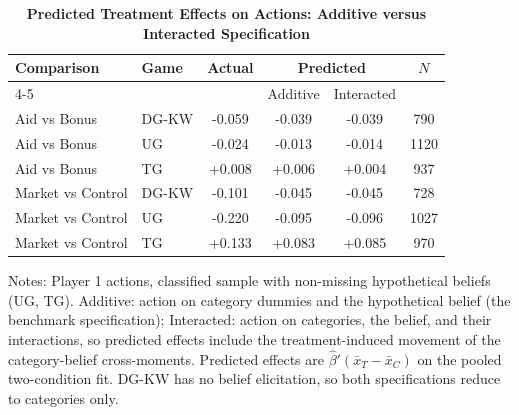 \begin{table}[!htbp]
\centering
\footnotesize
\renewcommand{\arraystretch}{1.15}
\caption{\textbf{Predicted Treatment Effects on Actions: Additive versus Interacted Specification}}
\label{tab:interaction_accounting}
\begin{tabular}{ll ccc c}
\toprule
Comparison & Game & Actual & \multicolumn{2}{c}{Predicted} & $N$ \\
\cmidrule(lr){4-5}
& & & Additive & Interacted & \\
\midrule
Aid vs Bonus & DG-KW & -0.059 & -0.039 & -0.039 & 790 \\
Aid vs Bonus & UG & -0.024 & -0.013 & -0.014 & 1120 \\
Aid vs Bonus & TG & +0.008 & +0.006 & +0.004 & 937 \\
Market vs Control & DG-KW & -0.101 & -0.045 & -0.045 & 728 \\
Market vs Control & UG & -0.220 & -0.095 & -0.096 & 1027 \\
Market vs Control & TG & +0.133 & +0.083 & +0.085 & 970 \\
\bottomrule
\end{tabular}
\begin{flushleft}
\footnotesize Notes: Player 1 actions, classified sample with non-missing hypothetical beliefs (UG, TG). Additive: action on category dummies and the hypothetical belief (the benchmark specification); Interacted: action on categories, the belief, and their interactions, so predicted effects include the treatment-induced movement of the category-belief cross-moments. Predicted effects are $\hat\beta'(\bar{x}_T-\bar{x}_C)$ on the pooled two-condition fit. DG-KW has no belief elicitation, so both specifications reduce to categories only.
\end{flushleft}
\end{table}
